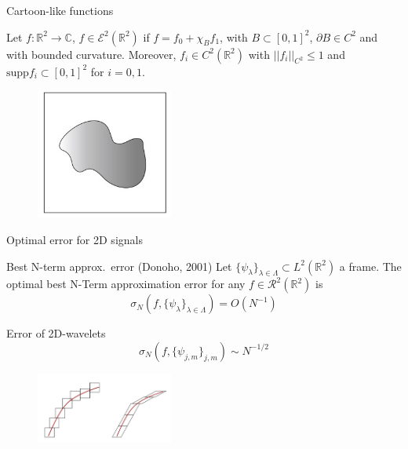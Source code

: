 \begin{frame}{Cartoon-like functions}
\begin{definition}
Let $f:\mathbb{R}^2\longrightarrow\mathbb{C}$, $f\in\mathcal{E}^2(\mathbb{R}^2)$ if $f= f_0+\chi_B f_1$, with $B\subset [0,1]^2$, $\partial B\in C^2$ and with bounded curvature. Moreover, $f_i\in C^2(\mathbb{R}^2)$ with $||f_i||_{C^2}\leq 1$ and $\text{supp} f_i\subset [0,1]^2$ for $i=0,1$. 
\end{definition}
\pause
\begin{figure}[h!]
\centering
\includegraphics[width=0.4\textwidth]{./Images/cartoon-like.jpg}
\end{figure}
\end{frame}

\begin{frame}{Optimal error for 2D signals}
\begin{block}{Best N-term approx.\ error (Donoho, 2001)}
Let $\{\psi_{\lambda}\}_{\lambda\in\Lambda}\subset L^2(\mathbb{R}^2)$ a frame. The optimal best N-Term approximation error for any $f\in\mathcal{R}^2(\mathbb{R}^2)$ is
$$
\sigma_N(f,\{\psi_{\lambda}\}_{\lambda\in\Lambda})=O(N^{-1})
$$
\end{block}
\pause
\begin{block}{Error of 2D-wavelets}
$$
\sigma_N(f,\{\psi_{j,m}\}_{j,m})\sim N^{-1/2}
$$
\end{block}
\pause
\begin{figure}[h!]
\centering
\includegraphics[width=0.4\textwidth]{./Images/anisotropic_isotropic.jpg}
\end{figure}
\end{frame}

